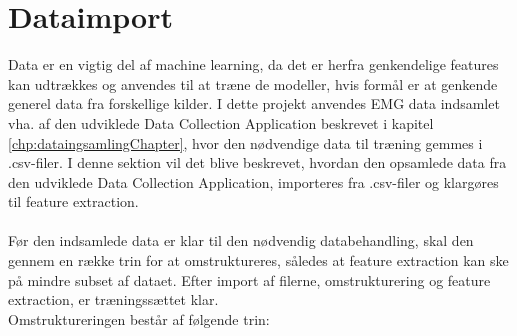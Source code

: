 \section{Dataimport}
Data er en vigtig del af machine learning, da det er herfra genkendelige features kan udtrækkes og anvendes til at træne de modeller, hvis formål er at genkende generel data fra forskellige kilder. I dette projekt anvendes EMG data indsamlet vha. af den udviklede Data Collection Application beskrevet i kapitel \ref{chp:dataingsamlingChapter}, hvor den nødvendige data til træning gemmes i .csv-filer. I denne sektion vil det blive beskrevet, hvordan den opsamlede data fra den udviklede Data Collection Application, importeres fra .csv-filer og klargøres til feature extraction.
\\\\
Før den indsamlede data er klar til den nødvendig databehandling, skal den gennem en række trin for at omstruktureres, således at feature extraction kan ske på mindre subset af dataet. Efter import af filerne, omstrukturering og feature extraction, er træningssættet klar.  
\\ Omstruktureringen består af følgende trin:
